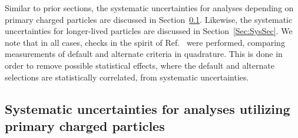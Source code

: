 Similar to prior sections, the systematic uncertainties for analyses depending on primary charged particles  are discussed in Section~\ref{Sec:SysPrim}. Likewise, the systematic uncertainties for longer-lived particles are discussed in Section~\ref{Sec:SysSec}. We note that in all cases, checks in the spirit of Ref.~\cite{Barlow:2002yb} were performed, comparing measurements of default and alternate criteria in quadrature. This is done in order to remove possible statistical effects, where the default and alternate selections are statistically correlated, from systematic uncertainties. 

\subsection{Systematic uncertainties for analyses utilizing primary charged particles}\label{Sec:SysPrim}

